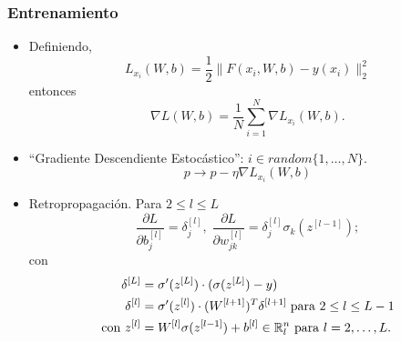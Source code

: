 \documentclass[aspectratio=1610]{beamer}
\begin{document}
  \begin{frame}
    \frametitle{Entrenamiento}

    \begin{itemize}
    \item Definiendo,
      \begin{displaymath}
        L_{x_i}(W,b) = \frac{1}{2} \|F(x_i,W,b) - y(x_i) \|^2_2
      \end{displaymath}
      entonces
      \begin{displaymath}
        \nabla L(W,b) = \frac{1}{N} \sum_{i=1}^N \nabla L_{x_i}(W,b).
      \end{displaymath}
      
    \item \textquotedblleft Gradiente Descendiente Estoc\'astico\textquotedblright:  $i\in random\{1,\ldots,N\}$.
      \begin{displaymath}
        p \to p - \eta \nabla L_{x_i}(W,b)
      \end{displaymath}
    \item Retropropagaci\'on. Para $2 \leq l \leq L$
      \begin{displaymath}
        \frac{\partial L}{\partial b_j^{[l]}} = \delta_j^{[l]}, \; \frac{\partial L}{\partial w_{jk}^{[l]}} = \delta_j^{[l]} \sigma_k(z^{[l-1]}); 
      \end{displaymath}
con
\begin{align*}
  \delta^{[L]} &= \sigma^\prime (z^{[L]})\cdot (\sigma(z^{[L]}) -y ) \\
  \delta^{[l]} &= \sigma^\prime (z^{[l]})\cdot (W^{[l+1]})^T\delta^{[l+1]}  \; \textnormal{para } 2\leq l\leq L-1\\
 \textnormal{con } z^{[l]}&=W^{[l]}\sigma(z^{[l-1]})+b^{[l]}\in \mathbb{R}^n_l  \textnormal{ para } l=2,\ldots,L.
\end{align*}

\end{itemize}
    

\end{frame}
\end{document}
